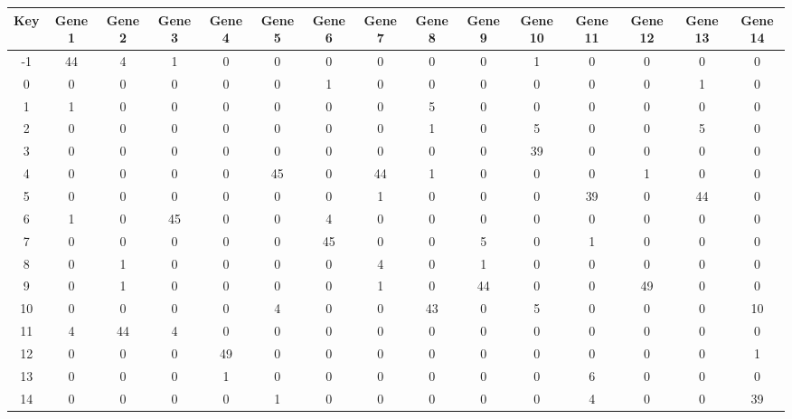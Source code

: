 \begin{tabular}{|c|c|c|c|c|c|c|c|c|c|c|c|c|c|c|}
\hline
Key & Gene 1 & Gene 2 & Gene 3 & Gene 4 & Gene 5 & Gene 6 & Gene 7 & Gene 8 & Gene 9 & Gene 10 & Gene 11 & Gene 12 & Gene 13 & Gene 14 \\
\hline
-1 & 44 & 4 & 1 & 0 & 0 & 0 & 0 & 0 & 0 & 1 & 0 & 0 & 0 & 0 \\
0 & 0 & 0 & 0 & 0 & 0 & 1 & 0 & 0 & 0 & 0 & 0 & 0 & 1 & 0 \\
1 & 1 & 0 & 0 & 0 & 0 & 0 & 0 & 5 & 0 & 0 & 0 & 0 & 0 & 0 \\
2 & 0 & 0 & 0 & 0 & 0 & 0 & 0 & 1 & 0 & 5 & 0 & 0 & 5 & 0 \\
3 & 0 & 0 & 0 & 0 & 0 & 0 & 0 & 0 & 0 & 39 & 0 & 0 & 0 & 0 \\
4 & 0 & 0 & 0 & 0 & 45 & 0 & 44 & 1 & 0 & 0 & 0 & 1 & 0 & 0 \\
5 & 0 & 0 & 0 & 0 & 0 & 0 & 1 & 0 & 0 & 0 & 39 & 0 & 44 & 0 \\
6 & 1 & 0 & 45 & 0 & 0 & 4 & 0 & 0 & 0 & 0 & 0 & 0 & 0 & 0 \\
7 & 0 & 0 & 0 & 0 & 0 & 45 & 0 & 0 & 5 & 0 & 1 & 0 & 0 & 0 \\
8 & 0 & 1 & 0 & 0 & 0 & 0 & 4 & 0 & 1 & 0 & 0 & 0 & 0 & 0 \\
9 & 0 & 1 & 0 & 0 & 0 & 0 & 1 & 0 & 44 & 0 & 0 & 49 & 0 & 0 \\
10 & 0 & 0 & 0 & 0 & 4 & 0 & 0 & 43 & 0 & 5 & 0 & 0 & 0 & 10 \\
11 & 4 & 44 & 4 & 0 & 0 & 0 & 0 & 0 & 0 & 0 & 0 & 0 & 0 & 0 \\
12 & 0 & 0 & 0 & 49 & 0 & 0 & 0 & 0 & 0 & 0 & 0 & 0 & 0 & 1 \\
13 & 0 & 0 & 0 & 1 & 0 & 0 & 0 & 0 & 0 & 0 & 6 & 0 & 0 & 0 \\
14 & 0 & 0 & 0 & 0 & 1 & 0 & 0 & 0 & 0 & 0 & 4 & 0 & 0 & 39 \\
\hline
\end{tabular}